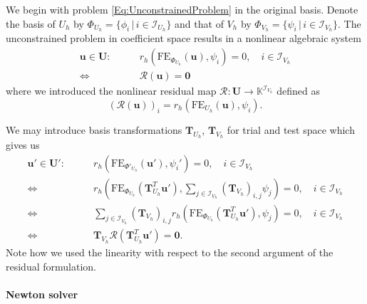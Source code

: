 We begin with problem \eqref{Eq:UnconstrainedProblem} in the
original basis. Denote the basis of $U_h$ by
$\Phi_{U_h}=\{\phi_i\,|\, i\in\mathcal{I}_{U_h}\}$ and that of $V_h$
by $\Phi_{V_h}=\{\psi_i\,|\, i\in\mathcal{I}_{V_h}\}$.
The unconstrained problem in coefficient space results in a nonlinear
algebraic system
\begin{equation}
\begin{split}
\mathbf{u}\in\mathbf{U} : \qquad
& r_h\left(\text{FE}_{\Phi_{U_h}}(\mathbf{u}),\psi_i\right) = 0, \quad
i\in\mathcal{I}_{V_h} \\
\Leftrightarrow \  & \mathcal{R}(\mathbf{u}) = \mathbf{0}
\end{split}
\end{equation}
where we introduced the nonlinear residual map $\mathcal{R} :
\mathbf{U} \to \mathbb{K}^{\mathcal{I}_{V_h}}$ defined as 
\begin{equation}
\left(
\mathcal{R}(\mathbf{u})\right)_i =
r_h(\text{FE}_{U_h}(\mathbf{u}),\psi_i).
\end{equation}

We may introduce basis transformations $\mathbf{T}_{U_h}$,
$\mathbf{T}_{V_h}$ for trial and test space which gives us
\begin{equation}\label{Eq:TransformedUnconstrainedProblem}
\begin{split}
\mathbf{u}'\in\mathbf{U}' : \qquad 
& r_h\left(\text{FE}_{\Phi'_{U_h}}(\mathbf{u}'),\psi_i'\right) = 0, \quad
i\in\mathcal{I}_{V_h}\\
\Leftrightarrow \  &
r_h\left(\text{FE}_{\Phi_{U_h}}(\mathbf{T}^T_{U_h}\mathbf{u}'),
\sum_{j\in\mathcal{I}_{V_h}}\left(\mathbf{T}_{V_h}\right)_{i,j}\psi_j\right) = 0, \quad
i\in\mathcal{I}_{V_h}\\
\Leftrightarrow \  &
\sum_{j\in\mathcal{I}_{V_h}} \left(\mathbf{T}_{V_h}\right)_{i,j} 
r_h\left(\text{FE}_{\Phi_{U_h}}(\mathbf{T}^T_{U_h}\mathbf{u}'),
\psi_j\right) = 0, \quad
i\in\mathcal{I}_{V_h}\\
\Leftrightarrow \  &
\mathbf{T}_{V_h} \mathcal{R}\left(\mathbf{T}^T_{U_h}\mathbf{u}'\right)
= \mathbf{0} .
\end{split}
\end{equation}
Note how we used the linearity with respect to the second argument of
the residual formulation.

\paragraph{Newton solver}

